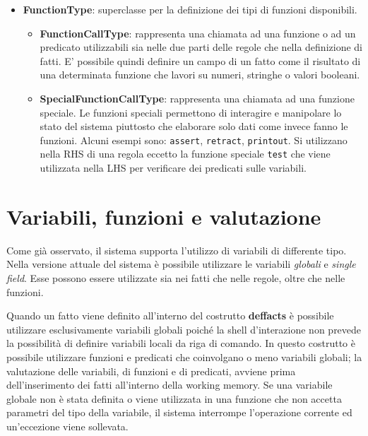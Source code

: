 \begin{itemize}
\begin{itemize}
		\end{itemize}
	\item \textbf{FunctionType}: superclasse per la definizione dei tipi di funzioni disponibili.
		\begin{itemize}
			\item \textbf{FunctionCallType}: rappresenta una chiamata ad una funzione o ad un predicato utilizzabili sia nelle due parti delle regole che nella definizione di fatti. E' possibile quindi definire un campo di un fatto come il risultato di una determinata funzione che lavori su numeri, stringhe o valori booleani.
			\item \textbf{SpecialFunctionCallType}: rappresenta una chiamata ad una funzione speciale. Le funzioni speciali permettono di interagire e manipolare lo stato del sistema piuttosto che elaborare solo dati come invece fanno le funzioni. Alcuni esempi sono: \verb!assert!, \verb!retract!, \verb!printout!. Si utilizzano nella RHS di una regola eccetto la funzione speciale \verb!test! che viene utilizzata nella LHS per verificare dei predicati sulle variabili.
		\end{itemize}
\end{itemize} 


\section{Variabili, funzioni e valutazione}
Come già osservato, il sistema supporta l'utilizzo di variabili di differente tipo. Nella versione attuale del sistema è possibile utilizzare le variabili \emph{globali} e \emph{single field}. Esse possono essere utilizzate sia nei fatti che nelle regole, oltre che nelle funzioni.

Quando un fatto viene definito all'interno del costrutto \textbf{deffacts} è possibile utilizzare esclusivamente variabili globali poiché la shell d'interazione non prevede la possibilità di definire variabili locali da riga di comando. In questo costrutto è possibile utilizzare funzioni e predicati che coinvolgano o meno variabili globali; la valutazione delle variabili, di funzioni e di predicati, avviene prima dell'inserimento dei fatti all'interno della working memory. Se una variabile globale non è stata definita o viene utilizzata in una funzione che non accetta parametri del tipo della variabile, il sistema interrompe l'operazione corrente ed un'eccezione viene sollevata.

